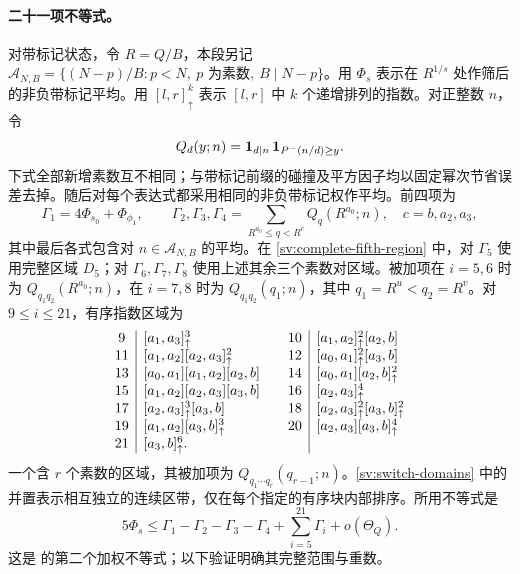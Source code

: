 \paragraph{二十一项不等式。}
对带标记状态，令 $R=Q/B$，本段另记 $\mathcal A_{N,B}=\{(N-p)/B:p<N,\ p\text{ 为素数},\ B\mid N-p\}$。用 $\Phi_s$ 表示在 $R^{1/s}$ 处作筛后的非负带标记平均。用 $[l,r]^k_\uparrow$ 表示 $[l,r]$ 中 $k$ 个递增排列的指数。对正整数 $n$，令
\[
 Q_d(y;n)=\mathbf 1_{d\mid n}\,
                  \mathbf 1_{P^-(n/d)\ge y}.
\]
下式全部新增素数互不相同；与带标记前缀的碰撞及平方因子均以固定幂次节省误差去掉。随后对每个表达式都采用相同的非负带标记权作平均。前四项为
\[
 \Gamma_1=4\Phi_{s_0}+\Phi_{\phi_1},\qquad
 \Gamma_2,\Gamma_3,\Gamma_4
   =\sum_{R^{a_0}\le q<R^c}Q_q(R^{a_0};n),
 \quad c=b,a_2,a_3,
\]
其中最后各式包含对 $n\in\mathcal A_{N,B}$ 的平均。在 \eqref{sv:complete-fifth-region} 中，对 $\Gamma_5$ 使用完整区域 $D_5$；对 $\Gamma_6,\Gamma_7,\Gamma_8$ 使用上述其余三个素数对区域。被加项在 $i=5,6$ 时为 $Q_{q_1q_2}(R^{a_0};n)$，在 $i=7,8$ 时为 $Q_{q_1q_2}(q_1;n)$，其中 $q_1=R^u<q_2=R^v$。对 $9\le i\le21$，有序指数区域为
\begin{equation}\label{sv:switch-domains}
\begin{array}{c|l@{\qquad}c|l}
9 &[a_1,a_3]^3_\uparrow
 &10 &[a_1,a_2]^2_\uparrow[a_2,b]\\
11 &[a_1,a_2][a_2,a_3]^2_\uparrow
 &12 &[a_0,a_1]^2_\uparrow[a_3,b]\\
13 &[a_0,a_1][a_1,a_2][a_2,b]
 &14 &[a_0,a_1][a_2,b]^2_\uparrow\\
15 &[a_1,a_2][a_2,a_3][a_3,b]
 &16 &[a_2,a_3]^4_\uparrow\\
17 &[a_2,a_3]^3_\uparrow[a_3,b]
 &18 &[a_2,a_3]^2_\uparrow[a_3,b]^2_\uparrow\\
19 &[a_1,a_2][a_3,b]^3_\uparrow
 &20 &[a_2,a_3][a_3,b]^4_\uparrow\\
21 &[a_3,b]^6_\uparrow.&&
\end{array}
\end{equation}
一个含 $r$ 个素数的区域，其被加项为 $Q_{q_1\cdots q_r}(q_{r-1};n)$。\eqref{sv:switch-domains} 中的并置表示相互独立的连续区带，仅在每个指定的有序块内部排序。所用不等式是
\begin{equation}\label{sv:twenty-one-weight}
 5\Phi_s\le\Gamma_1-\Gamma_2-\Gamma_3-\Gamma_4
                       +\sum_{i=5}^{21}\Gamma_i+o(\Theta_Q).
\end{equation}
这是 \cite[引理~4.2]{Wu2004} 的第二个加权不等式；以下验证明确其完整范围与重数。

